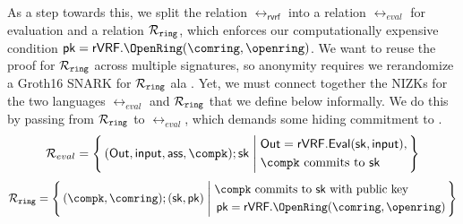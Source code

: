 As a step towards this, we split the relation $ \rel_{\mathsf{rvrf}} $ into a relation
$ \rel_{eval} $ for \rVRF evaluation and a relation $ \mathcal{R}_{\mathtt{ring}} $, which enforces our
computationally expensive condition $\pk = \rVRF.\OpenRing(\comring,\openring)$.
We want to reuse the proof for $ \mathcal{R}_{\mathtt{ring}} $ across multiple \rVRF signatures, so anonymity
requires we rerandomize a Groth16 SNARK for $ \mathcal{R}_{\mathtt{ring}} $
ala \cite[Theorem 3, Appendix C, pp. 31]{RandomizationGroth16}.
%
Yet, we must connect together the NIZKs for the two languages  $ \rel_{eval} $ and $ \mathcal{R}_{\mathtt{ring}}  $ that we define below informally. We do this by passing \pk from $ \mathcal{R}_{\mathtt{ring}}  $ to $ \rel_{eval} $, which
demands some hiding commitment \compk to \pk.
\vspace{-3mm}
%
\def\tmpAA{\Out = \rVRF.\Eval(\sk,\msg)}%
\def\tmpBB{\textrm{\compk commits to\ \sk}}%
$$ \rel_{eval} = \Setst{ (\Out, \msg, \aux, \compk); \sk}{
	\eprint{
		\tmpAA, \, \tmpBB
	}{
		\begin{aligned}
			&\tmpAA, \\
			&\tmpBB \\
		\end{aligned}
	}
} $$
\vspace{-3mm}
\def\tmpAA{\textrm{\compk commits to $ \sk $ with public key\ }}%
\def\tmpBB{\rVRF.\OpenRing(\comring,\openring)}%
$$ \Rring = \Setst{ (\compk, \comring);(\sk,\pk) }{
	\eprint{
		\tmpAA \pk = \tmpBB
	}{
		\begin{aligned}
			&\tmpAA \\
			&\, \pk = \tmpBB \\
		\end{aligned}
	}
} $$


